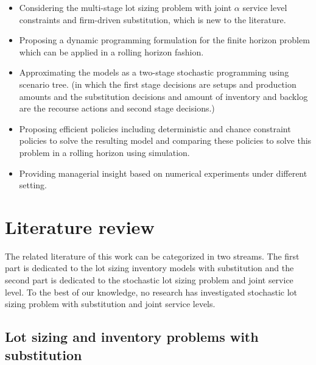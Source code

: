 \documentclass[10pt]{article}
\begin{document}
    
\begin{itemize}
\item Considering the multi-stage lot sizing problem with joint $\alpha$ service level constraints and firm-driven substitution, which is new to the literature.

\item Proposing a dynamic programming formulation for the finite horizon problem which can be applied in a rolling horizon fashion.
\item Approximating the models as a two-stage stochastic programming using scenario tree. (in which the first stage decisions are setups and production amounts and the substitution decisions and amount of inventory and backlog are the recourse actions and second stage decisions.)
\item Proposing efficient policies including deterministic and chance constraint policies to solve the resulting model and comparing these policies to solve this problem in a rolling horizon using simulation.
    \item Providing managerial insight based on numerical experiments under different setting.%
    


\end{itemize}

\section{Literature review}
The related literature of this work can be categorized in two streams. The first part is dedicated to the lot sizing inventory models with substitution and the second part is dedicated to the stochastic lot sizing problem and joint service level. To the best of our knowledge, no research has investigated stochastic lot sizing problem with substitution and joint service levels.

\subsection{Lot sizing and inventory problems with substitution}
\end{document}

